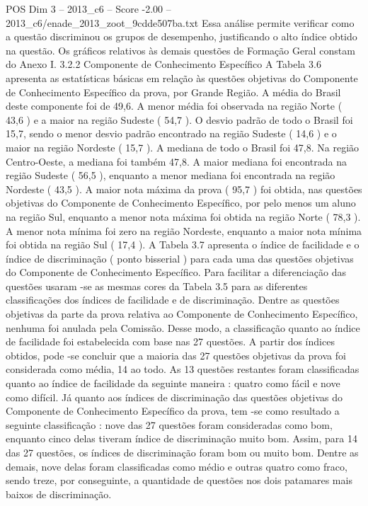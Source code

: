 \begin{textsample}{POS Dim 3 – 2013\_c6 – Score -2.00 – 2013\_c6/enade\_2013\_zoot\_9cdde507ba.txt}
Essa análise permite verificar como a questão discriminou os grupos de desempenho, justificando o alto índice obtido na questão.
Os gráficos relativos às demais questões de Formação Geral constam do Anexo I. 3.2.2 Componente de Conhecimento Específico A Tabela 3.6 apresenta as estatísticas básicas em relação às questões objetivas do Componente de Conhecimento Específico da prova, por Grande Região.
A média do Brasil deste componente foi de 49,6.
A menor média foi observada na região Norte ( 43,6 ) e a maior na região Sudeste ( 54,7 ).
O desvio padrão de todo o Brasil foi 15,7, sendo o menor desvio padrão encontrado na região Sudeste ( 14,6 ) e o maior na região Nordeste ( 15,7 ).
A mediana de todo o Brasil foi 47,8.
Na região Centro-Oeste, a mediana foi também 47,8.
A maior mediana foi encontrada na região Sudeste ( 56,5 ), enquanto a menor mediana foi encontrada na região Nordeste ( 43,5 ).
A maior nota máxima da prova ( 95,7 ) foi obtida, nas questões objetivas do Componente de Conhecimento Específico, por pelo menos um aluno na região Sul, enquanto a menor nota máxima foi obtida na região Norte ( 78,3 ).
A menor nota mínima foi zero na região Nordeste, enquanto a maior nota mínima foi obtida na região Sul ( 17,4 ).
A Tabela 3.7 apresenta o índice de facilidade e o índice de discriminação ( ponto bisserial ) para cada uma das questões objetivas do Componente de Conhecimento Específico.
Para facilitar a diferenciação das questões usaram -se as mesmas cores da Tabela 3.5 para as diferentes classificações dos índices de facilidade e de discriminação.
Dentre as questões objetivas da parte da prova relativa ao Componente de Conhecimento Específico, nenhuma foi anulada pela Comissão.
Desse modo, a classificação quanto ao índice de facilidade foi estabelecida com base nas 27 questões.
A partir dos índices obtidos, pode -se concluir que a maioria das 27 questões objetivas da prova foi considerada como média, 14 ao todo.
As 13 questões restantes foram classificadas quanto ao índice de facilidade da seguinte maneira : quatro como fácil e nove como difícil.
Já quanto aos índices de discriminação das questões objetivas do Componente de Conhecimento Específico da prova, tem -se como resultado a seguinte classificação : nove das 27 questões foram consideradas como bom, enquanto cinco delas tiveram índice de discriminação muito bom.
Assim, para 14 das 27 questões, os índices de discriminação foram bom ou muito bom.
Dentre as demais, nove delas foram classificadas como médio e outras quatro como fraco, sendo treze, por conseguinte, a quantidade de questões nos dois patamares mais baixos de discriminação.

\end{textsample}
